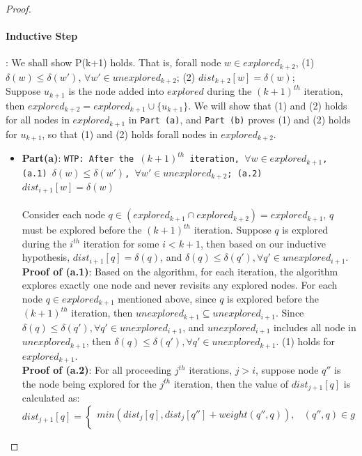 \begin{proof}
\paragraph*{Inductive Step}: We shall show P(k+1) holds. That is, forall node $w \in explored_{k+2}$, (1) $\delta(w) \leq \delta(w')$, $\forall w' \in unexplored_{k+2}$; (2) $dist_{k+2}[w] = \delta(w)$;
\\
Suppose $u_{k+1}$ is the node added into $explored$ during the $(k+1)^{th}$ iteration, then $explored_{k+2} = explored_{k+1} \cup \{u_{k+1}\}$. We will show that (1) and (2) holds for all nodes in $explored_{k+1}$ in \texttt{Part (a)}, and \texttt{Part (b)} proves (1) and (2) holds for $u_{k+1}$, so that (1) and (2) holds forall nodes in $explored_{k+2}$. 
\begin{itemize}
  \item \textbf{\large{Part(a)}}: \texttt{WTP: After the $(k+1)^{th}$ iteration, $\forall w \in explored_{k+1}$, (a.1) $\delta(w) \leq \delta(w')$, $\forall w' \in unexplored_{k+2}$; (a.2) $dist_{i+1}[w] = \delta(w)$} 
  \\\\
  Consider each node $q \in (explored_{k+1} \cap explored_{k+2}) = explored_{k+1}$, $q$ must be explored before the $(k+1)^{th}$ iteration. Suppose $q$ is explored during the $i^{th}$ iteration for some $i < k+1$, then based on our inductive hypothesis, $dist_{i+1}[q] = \delta(q)$, and $\delta(q) \leq \delta(q'), \forall q' \in unexplored_{i+1}$. 
  \\
  \textbf{Proof of (a.1)}: Based on the algorithm, for each iteration, the algorithm explores exactly one node and never revisits any explored nodes. For each node $q \in explored_{k+1}$ mentioned above, since $q$ is explored before the $(k+1)^{th}$ iteration, then $unexplored_{k+1} \subseteq unexplored_{i+1}$. Since $\delta(q) \leq \delta(q'), \forall q' \in unexplored_{i+1}$, and $unexplored_{i+1}$ includes all node in $unexplored_{k+1}$, then $\delta(q) \leq \delta(q'), \forall q' \in unexplored_{k+1}$. (1) holds for $explored_{k+1}$. 
  \\
  \textbf{Proof of (a.2)}: For all proceeding $j^{th}$ iterations, $j > i$, suppose node $q''$ is the node being explored for the $j^{th}$ iteration, then the value of $dist_{j+1}[q]$ is calculated as: 
  \\
      \[
        dist_{j+1}[q] = \left.
       \begin{cases} 
          min(dist_j[q], dist_j[q''] + weight(q'', q)), & (q'',q) \in g \\ 

\end{cases}\]
\end{itemize}
\end{proof}
